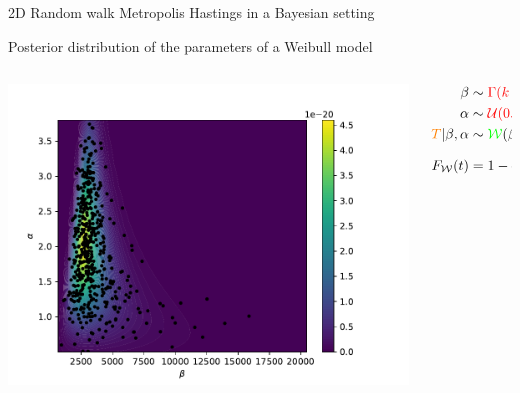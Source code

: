 \documentclass{beamer}
\newcommand{\prior}[1]{\textcolor{red}{#1}}
\newcommand{\likelihood}[1]{\textcolor{green}{#1}}
\newcommand{\observation}[1]{\textcolor{orange}{#1}}
\begin{document}

\begin{frame}[containsverbatim]{2D Random walk Metropolis Hastings in a Bayesian setting}

    \begin{block}{Posterior distribution of the parameters of a Weibull model}
        \begin{columns}
            \begin{column}{0.4\textwidth}
                \includegraphics[width=\textwidth]{figures/fiabilite}
            \end{column}
            \begin{column}{0.6\textwidth}
                \vspace{-0.5cm}
                \begin{align*}
                    \beta &\sim \prior{\Gamma(k=2, \lambda=2\cdot 10^{-4})} \\
                    \alpha &\sim \prior{\mathcal{U}(0.5, 3.8)} \\
                    \observation{T} | \beta, \alpha &\sim \likelihood{\mathcal{W}}(\beta, \alpha, 0) \\
                    F_{\mathcal{W}}(t) &= 1 - \exp \left[ - \left( \frac{t - 0}{\beta}\right)^\alpha\right]
                \end{align*}
            \end{column}
        \end{columns}




\end{block}
\end{frame}
\end{document}
